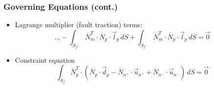 \documentclass{beamer}
\newcommand{\tensor}[1]{\overline{#1}}
\begin{document}
\begin{frame}
  \frametitle{Governing Equations (cont.)}
  \summary{}

  \begin{itemize}
  \item Lagrange multiplier (fault traction) terms:
    \begin{equation}
      \ldots 
      - \int_{S_{f^+}} \tensor{N}_m^T \cdot \tensor{N}_p \cdot \vec{l}_p \, dS
      + \int_{S_{f^-}} \tensor{N}_m^T \cdot \tensor{N}_p \cdot \vec{l}_p \, dS
      = \vec{0}
    \end{equation}
  \item Constraint equation
    \begin{equation}
      \int_{S_f} \tensor{N}_p^T \cdot 
      \left( \tensor{N}_p \cdot \vec{d}_p
        - \tensor{N}_{n^+} \cdot \vec{u}_{n^+} 
        + \tensor{N}_{n^-} \cdot \vec{u}_{n^-}
      \right) \, dS = \vec{0}
    \end{equation}
  \end{itemize}

\end{frame}
\end{document}
